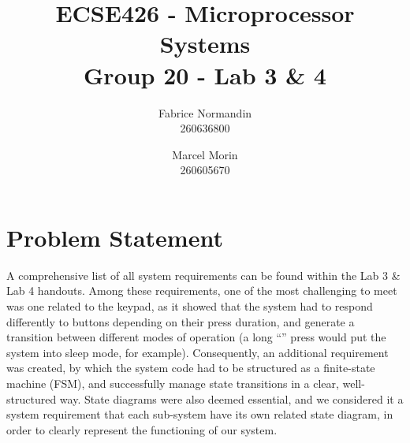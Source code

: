 \documentclass{article}
\begin{document}
\title{ECSE426 - Microprocessor Systems \\ Group 20 - Lab 3 \& 4}
\author{Fabrice Normandin \\ 260636800 \and Marcel Morin \\ 260605670}
\maketitle





\listoftodos
\pagebreak
\tableofcontents
\pagebreak

\section{Problem Statement}
A comprehensive list of all system requirements can be found within the Lab 3 \& Lab 4 handouts. Among these requirements, one of the most challenging to meet was one related to the keypad, as it showed that the system had to respond differently to buttons depending on their press duration, and generate a transition between different modes of operation (a long “\*” press would put the system into sleep mode, for example). Consequently, an additional requirement was created, by which the system code had to be structured as a finite-state machine (FSM), and successfully manage state transitions in a clear, well-structured way. State diagrams were also deemed essential, and we considered it a system requirement that each sub-system have its own related state diagram, in order to clearly represent the functioning of our system.







\end{document}
